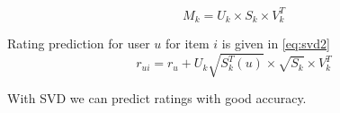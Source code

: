 \begin{equation}
M_{k} = U_{k} \times S_{k} \times V_{k}^{T} 
\label{svd1}
\end{equation}

\noindent Rating prediction for user $u$ for item $i$ is given in \autoref{eq:svd2} \\

\begin{equation}
r_{ui} = r_{u} + U_{k} \sqrt{S_{k}^{T} (u)} \times \sqrt{S_k} \times V_{k}^{T}
\label{svd2}
\end{equation}

\noindent With SVD we can predict ratings with good accuracy.



